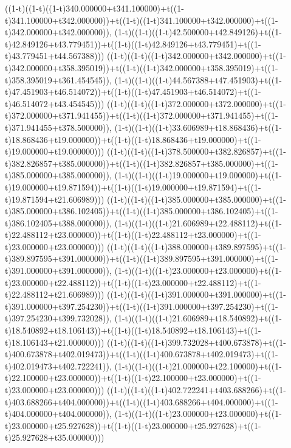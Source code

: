 ((1-t)((1-t)((1-t)340.000000+t341.100000)+t((1-t)341.100000+t342.000000))+t((1-t)((1-t)341.100000+t342.000000)+t((1-t)342.000000+t342.000000)),                                     (1-t)((1-t)((1-t)42.500000+t42.849126)+t((1-t)42.849126+t43.779451))+t((1-t)((1-t)42.849126+t43.779451)+t((1-t)43.779451+t44.567388)))
((1-t)((1-t)((1-t)342.000000+t342.000000)+t((1-t)342.000000+t358.395019))+t((1-t)((1-t)342.000000+t358.395019)+t((1-t)358.395019+t361.454545)),                                     (1-t)((1-t)((1-t)44.567388+t47.451903)+t((1-t)47.451903+t46.514072))+t((1-t)((1-t)47.451903+t46.514072)+t((1-t)46.514072+t43.454545)))
((1-t)((1-t)((1-t)372.000000+t372.000000)+t((1-t)372.000000+t371.941455))+t((1-t)((1-t)372.000000+t371.941455)+t((1-t)371.941455+t378.500000)),                                     (1-t)((1-t)((1-t)33.606989+t18.868436)+t((1-t)18.868436+t19.000000))+t((1-t)((1-t)18.868436+t19.000000)+t((1-t)19.000000+t19.000000)))
((1-t)((1-t)((1-t)378.500000+t382.826857)+t((1-t)382.826857+t385.000000))+t((1-t)((1-t)382.826857+t385.000000)+t((1-t)385.000000+t385.000000)),                                     (1-t)((1-t)((1-t)19.000000+t19.000000)+t((1-t)19.000000+t19.871594))+t((1-t)((1-t)19.000000+t19.871594)+t((1-t)19.871594+t21.606989)))
((1-t)((1-t)((1-t)385.000000+t385.000000)+t((1-t)385.000000+t386.102405))+t((1-t)((1-t)385.000000+t386.102405)+t((1-t)386.102405+t388.000000)),                                     (1-t)((1-t)((1-t)21.606989+t22.488112)+t((1-t)22.488112+t23.000000))+t((1-t)((1-t)22.488112+t23.000000)+t((1-t)23.000000+t23.000000)))
((1-t)((1-t)((1-t)388.000000+t389.897595)+t((1-t)389.897595+t391.000000))+t((1-t)((1-t)389.897595+t391.000000)+t((1-t)391.000000+t391.000000)),                                     (1-t)((1-t)((1-t)23.000000+t23.000000)+t((1-t)23.000000+t22.488112))+t((1-t)((1-t)23.000000+t22.488112)+t((1-t)22.488112+t21.606989)))
((1-t)((1-t)((1-t)391.000000+t391.000000)+t((1-t)391.000000+t397.254230))+t((1-t)((1-t)391.000000+t397.254230)+t((1-t)397.254230+t399.732028)),                                     (1-t)((1-t)((1-t)21.606989+t18.540892)+t((1-t)18.540892+t18.106143))+t((1-t)((1-t)18.540892+t18.106143)+t((1-t)18.106143+t21.000000)))
((1-t)((1-t)((1-t)399.732028+t400.673878)+t((1-t)400.673878+t402.019473))+t((1-t)((1-t)400.673878+t402.019473)+t((1-t)402.019473+t402.722241)),                                     (1-t)((1-t)((1-t)21.000000+t22.100000)+t((1-t)22.100000+t23.000000))+t((1-t)((1-t)22.100000+t23.000000)+t((1-t)23.000000+t23.000000)))
((1-t)((1-t)((1-t)402.722241+t403.688266)+t((1-t)403.688266+t404.000000))+t((1-t)((1-t)403.688266+t404.000000)+t((1-t)404.000000+t404.000000)),                                     (1-t)((1-t)((1-t)23.000000+t23.000000)+t((1-t)23.000000+t25.927628))+t((1-t)((1-t)23.000000+t25.927628)+t((1-t)25.927628+t35.000000)))
